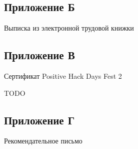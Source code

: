 \documentclass[14pt]{extarticle}
\begin{document}


\newpage

\begin{center}
\section*{Приложение Б}

Выписка из электронной трудовой книжки
\end{center}



\newpage

\begin{center}
\section*{Приложение В}

Сертификат Positive Hack Days Fest 2
\end{center}

TODO

\newpage

\begin{center}

\section*{Приложение Г}

Рекомендательное письмо
\end{center}


\end{document}
